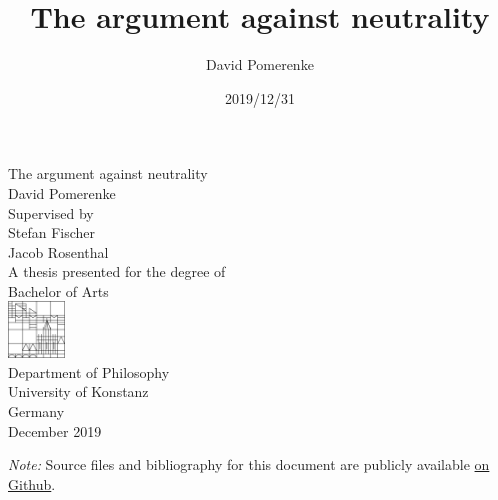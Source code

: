 \documentclass{report}
\title{The argument against neutrality}
\author{David Pomerenke}
\date{2019/12/31}
\begin{document}
\begin{titlepage}
    \begin{center}
        \vspace*{1cm}
        \huge
        The argument against neutrality\\
        \large
        David Pomerenke\\
        \vfill
        Supervised by\\
        Stefan Fischer\\
        Jacob Rosenthal\\
        \vfill
        A thesis presented for the degree of\\
        Bachelor of Arts\\
        \vfill
        \includegraphics[width=1.5cm]{0-logo.png}\\
        Department of Philosophy\\
        University of Konstanz\\
        Germany\\
        December 2019\\
    \end{center}
\end{titlepage}

\tableofcontents










\cite{pomerenke_nach_2017}




\emph{Note:} Source files and bibliography for this document are publicly available \href{https://github.com/davidpomerenke/ba}{on Github}.
\end{document}
